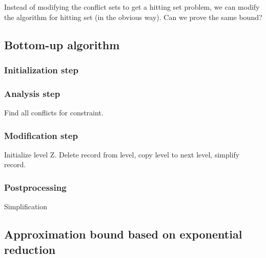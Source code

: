 Instead of modifying the conflict sets to get a hitting set problem, we can modify the algorithm for hitting set (in the obvious way). Can we prove the same bound?

\subsection{Bottom-up algorithm}

\subsubsection{Initialization step}

\subsubsection{Analysis step}

Find all conflicts for constraint.

\subsubsection{Modification step}

Initialize level Z. Delete record from level, copy level to next level, simplify record.

\subsubsection{Postprocessing}

Simplification


\subsection{Approximation bound based on exponential reduction}